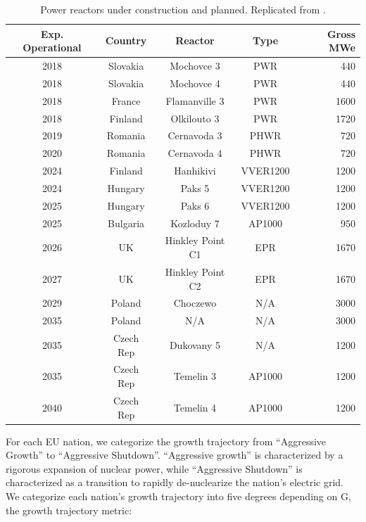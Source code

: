 \pagebreak
\begin{table}[h]
    \centering
    \caption {Power reactors under construction and planned. Replicated from \cite{world_nuclear_association_nuclear_2017}.}
    \label{tab:eu_deployment}
    \begin{tabular}{ccccr}
        \hline
        \textbf{Exp. Operational }&\textbf{Country} &\textbf{Reactor} & \textbf{Type} & \textbf{Gross \gls{MWe}}\\
        \hline
        2018 & Slovakia  & Mochovce 3 & PWR & 440\\
        2018 & Slovakia & Mochovce 4 & PWR & 440 \\
        2018 & France & Flamanville 3 & PWR & 1600 \\
        2018 & Finland & Olkilouto 3 & PWR & 1720 \\
        2019 & Romania & Cernavoda 3 & PHWR & 720 \\
        2020 & Romania & Cernavoda 4 & PHWR & 720 \\
        2024 & Finland & Hanhikivi & VVER1200 & 1200 \\
        2024 & Hungary & Paks 5 & VVER1200 & 1200 \\
        2025 & Hungary & Paks 6 & VVER1200 & 1200 \\
        2025 & Bulgaria & Kozloduy 7 & \footnotemark AP1000 & 950 \\
        2026 & UK & Hinkley Point C1 & EPR & 1670 \\
        2027 & UK & Hinkley Point C2 & EPR & 1670 \\
        2029 & Poland & Choczewo & N/A & 3000 \\
        2035 & Poland & N/A & N/A & 3000 \\
        2035 & Czech Rep & Dukovany 5 & N/A & 1200 \\
        2035 & Czech Rep & Temelin 3 & AP1000 & 1200 \\
        2040 & Czech Rep & Temelin 4 & AP1000 & 1200 \\
        \hline
    \end{tabular}
\end{table}

\FloatBarrier

For each \gls{EU} nation, we categorize the growth trajectory from
``Aggressive Growth'' to ``Aggressive Shutdown''. ``Aggressive growth'' is
characterized by a rigorous expansion of nuclear power, while
``Aggressive Shutdown'' is characterized as a transition to rapidly
de-nuclearize the nation's electric grid. We categorize each nation's growth 
trajectory into five degrees depending on G, the growth trajectory metric:

